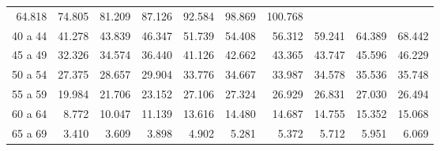 \begin{tabular}{llllllllll}
  \multicolumn{1}{r}{64.818} &
  \multicolumn{1}{r}{74.805} &
  \multicolumn{1}{r}{81.209} &
  \multicolumn{1}{r}{87.126} &
  \multicolumn{1}{r}{92.584} &
  \multicolumn{1}{r}{98.869} &
  \multicolumn{1}{r}{100.768} \\
\multicolumn{1}{l}{\hspace{1em}40 a 44} &
  \multicolumn{1}{|r}{41.278} &
  \multicolumn{1}{r}{43.839} &
  \multicolumn{1}{r}{46.347} &
  \multicolumn{1}{r}{51.739} &
  \multicolumn{1}{r}{54.408} &
  \multicolumn{1}{r}{56.312} &
  \multicolumn{1}{r}{59.241} &
  \multicolumn{1}{r}{64.389} &
  \multicolumn{1}{r}{68.442} \\
\multicolumn{1}{l}{\hspace{1em}45 a 49} &
  \multicolumn{1}{|r}{32.326} &
  \multicolumn{1}{r}{34.574} &
  \multicolumn{1}{r}{36.440} &
  \multicolumn{1}{r}{41.126} &
  \multicolumn{1}{r}{42.662} &
  \multicolumn{1}{r}{43.365} &
  \multicolumn{1}{r}{43.747} &
  \multicolumn{1}{r}{45.596} &
  \multicolumn{1}{r}{46.229} \\
\multicolumn{1}{l}{\hspace{1em}50 a 54} &
  \multicolumn{1}{|r}{27.375} &
  \multicolumn{1}{r}{28.657} &
  \multicolumn{1}{r}{29.904} &
  \multicolumn{1}{r}{33.776} &
  \multicolumn{1}{r}{34.667} &
  \multicolumn{1}{r}{33.987} &
  \multicolumn{1}{r}{34.578} &
  \multicolumn{1}{r}{35.536} &
  \multicolumn{1}{r}{35.748} \\
\multicolumn{1}{l}{\hspace{1em}55 a 59} &
  \multicolumn{1}{|r}{19.984} &
  \multicolumn{1}{r}{21.706} &
  \multicolumn{1}{r}{23.152} &
  \multicolumn{1}{r}{27.106} &
  \multicolumn{1}{r}{27.324} &
  \multicolumn{1}{r}{26.929} &
  \multicolumn{1}{r}{26.831} &
  \multicolumn{1}{r}{27.030} &
  \multicolumn{1}{r}{26.494} \\
\multicolumn{1}{l}{\hspace{1em}60 a 64} &
  \multicolumn{1}{|r}{8.772} &
  \multicolumn{1}{r}{10.047} &
  \multicolumn{1}{r}{11.139} &
  \multicolumn{1}{r}{13.616} &
  \multicolumn{1}{r}{14.480} &
  \multicolumn{1}{r}{14.687} &
  \multicolumn{1}{r}{14.755} &
  \multicolumn{1}{r}{15.352} &
  \multicolumn{1}{r}{15.068} \\
\multicolumn{1}{l}{\hspace{1em}65 a 69} &
  \multicolumn{1}{|r}{3.410} &
  \multicolumn{1}{r}{3.609} &
  \multicolumn{1}{r}{3.898} &
  \multicolumn{1}{r}{4.902} &
  \multicolumn{1}{r}{5.281} &
  \multicolumn{1}{r}{5.372} &
  \multicolumn{1}{r}{5.712} &
  \multicolumn{1}{r}{5.951} &
  \multicolumn{1}{r}{6.069} \\

\end{tabular}
